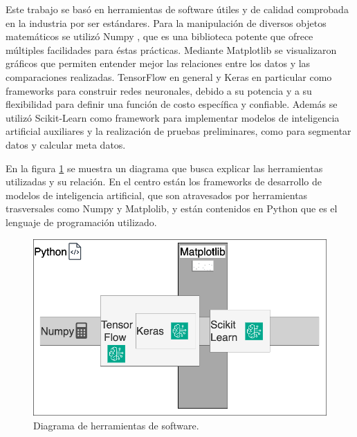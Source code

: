 Este trabajo se basó en herramientas de software útiles y de calidad comprobada en la industria por ser estándares. Para la manipulación de diversos objetos matemáticos se utilizó Numpy \citep{numpy}, que es una biblioteca potente que ofrece múltiples facilidades para éstas prácticas. 
Mediante Matplotlib \citep{matplotlib} se visualizaron gráficos que permiten entender mejor las relaciones entre los datos y las comparaciones realizadas. 
TensorFlow \citep{tensorflow} en general y Keras \citep{keras} en particular como frameworks para construir redes neuronales, debido a su potencia y a su flexibilidad para definir una función de costo específica y confiable.
Además se utilizó Scikit-Learn \citep{scikit-learn} como framework para implementar modelos de inteligencia artificial auxiliares y la realización de pruebas preliminares, como para segmentar datos y calcular meta datos.

En la figura \ref{fig:software} se muestra un diagrama que busca explicar las herramientas utilizadas y su relación. En el centro están los frameworks de desarrollo de modelos de inteligencia artificial, que son atravesados por herramientas trasversales como Numpy y Matplolib, y están contenidos en Python que es el lenguaje de programación utilizado.

\begin{figure}[htbp]
	\centering
	\includegraphics[width=1\textwidth]{./Figures/software.png}
	\caption{Diagrama de herramientas de software.}
	\label{fig:software}
\end{figure}
